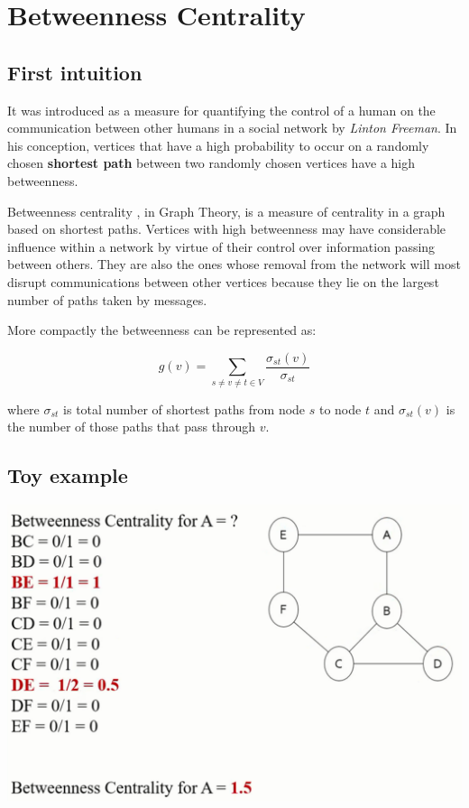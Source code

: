 \documentclass[11pt]{article}
\begin{document}
    \hypertarget{betweenness-centrality}{%
\section{Betweenness Centrality}\label{betweenness-centrality}}

\hypertarget{first-intuition}{%
\subsection{First intuition}\label{first-intuition}}

It was introduced as a measure for quantifying the control of a human on
the communication between other humans in a social network by
\emph{Linton Freeman}. In his conception, vertices that have a high
probability to occur on a randomly chosen \textbf{shortest path} between
two randomly chosen vertices have a high betweenness. 

    Betweenness centrality \cite{betweenneess_centrality}, in Graph Theory, is a measure of centrality in a
graph based on shortest paths. Vertices with high betweenness may have
considerable influence within a network by virtue of their control over
information passing between others. They are also the ones whose removal
from the network will most disrupt communications between other vertices
because they lie on the largest number of paths taken by messages.

    More compactly the betweenness can be represented as:

$$
g(v) =\sum\limits_{s\neq v\neq t \in V} \frac{\sigma_{st}(v)}{\sigma_{st}}
$$

where \textbf{\(\sigma_{st}\)} is total number of shortest paths from
node \(s\) to node \(t\) and \textbf{\(\sigma_{st}(v)\)} is the number
of those paths that pass through \(v\).

    \hypertarget{toy-example}{%
\subsection{Toy example}\label{toy-example}}
\includegraphics{./imgs/bc_toy_example.png}
\end{document}
